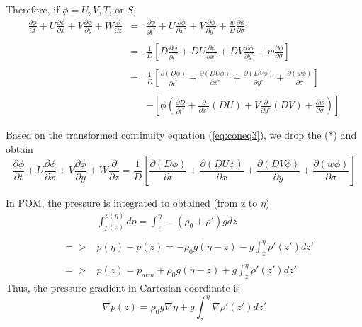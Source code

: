 \documentclass[oribibl]{llncs}
\begin{document}
Therefore, if $\phi=U,V,T$, or $S$,
\begin{eqnarray}
\frac{\partial \phi}{\partial t}+U\frac{\partial \phi}{\partial x} + V\frac{\partial \phi}{\partial y}+W\frac{\partial}{\partial z} &=& \frac{\partial \phi}{\partial t^*}+U\frac{\partial \phi}{\partial x^*} + V\frac{\partial \phi}{\partial y^*}+\frac{w}{D}\frac{\partial \phi}{\partial \sigma} \nonumber \\ \nonumber \\ 
&=& \frac{1}{D} \left[  D\frac{\partial \phi}{\partial t^*}+DU\frac{\partial \phi}{\partial x^*} + DV\frac{\partial \phi}{\partial y^*}+w\frac{\partial \phi}{\partial \sigma}  \right]  \nonumber \\ \nonumber \\ 
&=& \frac{1}{D} \left[  \frac{\partial (D\phi)}{\partial t^*}+\frac{\partial (DU\phi)}{\partial x^*} + \frac{\partial (DV\phi)}{\partial y^*}+\frac{\partial (w\phi)}{\partial \sigma}  \right]   \nonumber \\ \nonumber \\ 
&& - \left[ \phi \left( \frac{\partial D}{\partial t^*}+\frac{\partial}{\partial x^*}(DU) + V\frac{\partial }{\partial y^*}(DV)+\frac{\partial w}{\partial \sigma} \right) \right] 
\end{eqnarray}


Based on the transformed continuity equation (\ref{eq:coneq3}), we drop the (*) and obtain
\begin{equation}
\frac{\partial \phi}{\partial t}+U\frac{\partial \phi}{\partial x} + V\frac{\partial \phi}{\partial y}+W\frac{\partial}{\partial z} =  \frac{1}{D} \left[  \frac{\partial (D\phi)}{\partial t}+\frac{\partial (DU\phi)}{\partial x} + \frac{\partial (DV\phi)}{\partial y}+\frac{\partial (w\phi)}{\partial \sigma}  \right] 
\end{equation}

In POM, the pressure is integrated to obtained (from z to  $\eta $)
\begin{eqnarray}
&&\int_{p(z)}^{p(\eta)} dp = \int_z^\eta -(\rho_0 + \rho' )g dz \nonumber \\ \nonumber \\ 
&=>& p(\eta)-p(z) =-\rho_0 g (\eta - z) -g \int_z^\eta \rho'(z') dz' \nonumber \\ \nonumber \\ 
&=>& p(z) = p_{atm}+\rho_0 g (\eta - z) +g \int_z^\eta \rho'(z') dz'
\end{eqnarray}
Thus, the pressure gradient in Cartesian coordinate is 
\begin{equation}\label{eq:p1}
\nabla p(z) = \rho_0 g \nabla \eta  +g\int_z^\eta \nabla \rho'(z') dz'
\end{equation}
\end{document}
